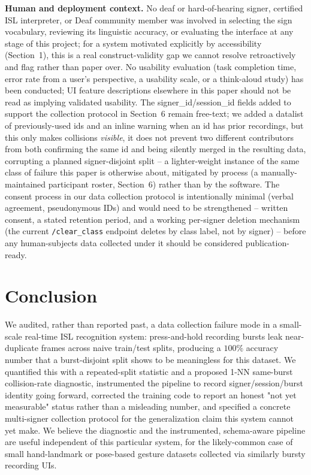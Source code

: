 \documentclass[runningheads]{llncs}
\begin{document}
\textbf{Human and deployment context.} No deaf or hard-of-hearing signer,
certified ISL interpreter, or Deaf community member was involved in
selecting the sign vocabulary, reviewing its linguistic accuracy, or
evaluating the interface at any stage of this project; for a system
motivated explicitly by accessibility (Section~1), this is a real
construct-validity gap we cannot resolve retroactively and flag rather
than paper over. No usability evaluation (task completion time, error
rate from a user's perspective, a usability scale, or a think-aloud
study) has been conducted; UI feature descriptions elsewhere in this
paper should not be read as implying validated usability. The
signer\_id/session\_id fields added to support the collection protocol
in Section~6 remain free-text; we added a datalist of previously-used
ids and an inline warning when an id has prior recordings, but this only
makes collisions \emph{visible}, it does not prevent two different
contributors from both confirming the same id and being silently merged
in the resulting data, corrupting a planned signer-disjoint split -- a
lighter-weight instance of the same class of failure this paper is
otherwise about, mitigated by process (a manually-maintained participant
roster, Section~6) rather than by the software. The consent process in
our data collection
protocol is intentionally minimal (verbal agreement, pseudonymous IDs)
and would need to be strengthened -- written consent, a stated retention
period, and a working per-signer deletion mechanism (the current
\texttt{/clear\_class} endpoint deletes by class label, not by signer) --
before any human-subjects data collected under it should be considered
publication-ready.

\section{Conclusion}

We audited, rather than reported past, a data collection failure mode in
a small-scale real-time ISL recognition system: press-and-hold recording
bursts leak near-duplicate frames across naive train/test splits,
producing a $100\%$ accuracy number that a burst-disjoint split shows to
be meaningless for this dataset. We quantified this with a repeated-split
statistic and a proposed 1-NN same-burst collision-rate diagnostic,
instrumented the pipeline to record signer/session/burst identity going
forward, corrected the training code to report an honest "not yet
measurable" status rather than a misleading number, and specified a
concrete multi-signer collection protocol for the generalization claim
this system cannot yet make. We believe the diagnostic and the
instrumented, schema-aware pipeline are useful independent of this
particular system, for the likely-common case of small hand-landmark or
pose-based gesture datasets collected via similarly bursty recording UIs.
\end{document}
